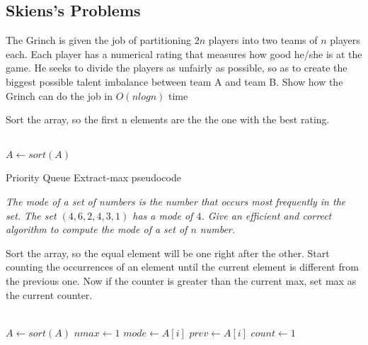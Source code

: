 \subsection{Skiens's Problems}

\begin{problem}
The Grinch is given the job of partitioning $2n$ players into two teams of $n$
players each. Each player has a numerical rating that measures how good he/she is
at the game. He seeks to divide the players as unfairly as possible, so as to create
the biggest possible talent imbalance between team A and team B. Show how the
Grinch can do the job in $O(n log n)$ time


\begin{solution}
Sort the array, so the first n elements are the the one with the best rating.
\hfill \\ \hfill \\
\begin{algorithm}[H]
 $A \gets sort(A)$\;
\;

\caption{Priority Queue Extract-max pseudocode}
\end{algorithm}



\end{solution}
\end{problem}

\begin{problem}
\textit{The mode of a set of numbers is the number that occurs most frequently in the
set. The set $(4, 6, 2, 4, 3, 1)$ has a mode of $4$. Give an efficient and correct algorithm
to compute the mode of a set of $n$ number.}

\begin{solution}
Sort the array, so the equal element will be one right after the other. Start counting the occurrences of an element until the current element is different from the previous one. Now if the counter is greater than the current max, set max as the current counter.
\hfill \\ \hfill \\
\begin{algorithm}[H]
 $A \gets sort(A)$\;
 $nmax \gets 1 $\;
 $mode \gets A[i] $\;
 $prev \gets A[i] $\;
 $count \gets 1 $\;
\;
\caption{}
\end{algorithm}


\end{solution}
\end{problem}

